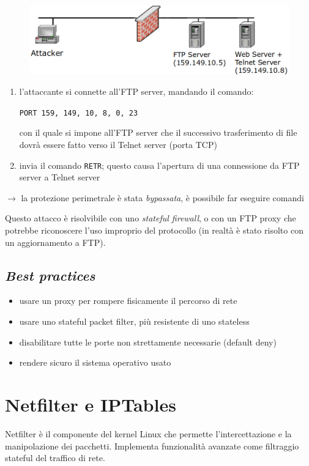 \begin{figure}[H]
    \centering
    \includegraphics[width=1\linewidth]{chapters/12/images/ftp-bounce.png}
\end{figure}


\begin{enumerate}
    \item l'attaccante si connette all'FTP server, mandando il comando:
    \begin{center}
        \texttt{PORT 159, 149, 10, 8, 0, 23}
    \end{center}
    con il quale si impone all'FTP server che il successivo trasferimento di file dovrà
    essere fatto verso il Telnet server (porta TCP)
    \item invia il comando \texttt{RETR}; questo causa l'apertura di una connessione 
    da FTP server a Telnet server 
\end{enumerate}

$\rightarrow$ la protezione perimetrale è stata \textit{bypassata}, è possibile 
far eseguire comandi

\noindent Questo attacco è risolvibile con uno \textit{stateful firewall}, o con 
un FTP proxy che potrebbe riconoscere l'uso improprio del protocollo (in realtà è stato 
risolto con un aggiornamento a FTP).

\subsection{\textit{Best practices}}
\begin{itemize}
    \item usare un proxy per rompere fisicamente il percorso di rete 
    \item usare uno stateful packet filter, più resistente di uno stateless 
    \item disabilitare tutte le porte non strettamente necessarie (default deny)
    \item rendere sicuro il sistema operativo usato 
\end{itemize}

\section{Netfilter e IPTables}
Netfilter è il componente del kernel Linux che permette l'intercettazione e 
la manipolazione dei pacchetti. Implementa funzionalità avanzate come filtraggio 
stateful del traffico di rete.

